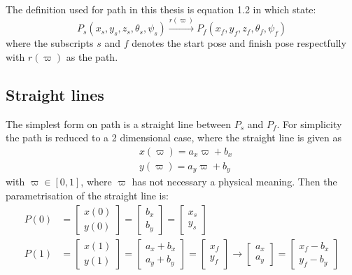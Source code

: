 The definition used for path in this thesis is equation 1.2 in \citep{tsourdos2010cooperative} which state:
\begin{equation}
P_s(x_s,y_s,z_s,\theta_s,\psi_s) \xrightarrow{r(\varpi)} P_f(x_f,y_f,z_f,\theta_f,\psi_f)
\end{equation}
where the subscripts $s$ and $f$ denotes the start pose and finish pose respectfully with $r(\varpi)$ as the path.

\subsection{Straight lines}
The simplest form on path is a straight line between $P_s$ and $P_f$. For simplicity the path is reduced to a 2 dimensional case, where the straight line is given as 
\begin{subequations}
\begin{align}
& x(\varpi) = a_x\varpi + b_x \\
& y(\varpi) = a_y\varpi + b_y 
\end{align}
\end{subequations}
with $ \varpi \in [0,1] $, where $\varpi$ has not necessary a physical meaning. Then the parametrisation of the straight line is:
\begin{subequations}
\begin{align}
P(0) &= \begin{bmatrix}
x(0) \\
y(0)
\end{bmatrix} = \begin{bmatrix}
b_x \\
b_y
\end{bmatrix} = \begin{bmatrix}
x_s \\
y_s
\end{bmatrix} \\
P(1) &= \begin{bmatrix}
x(1) \\
y(1)
\end{bmatrix} = \begin{bmatrix}
a_x + b_x \\
a_y + b_y
\end{bmatrix} = \begin{bmatrix}
x_f \\
y_f
\end{bmatrix} \rightarrow \begin{bmatrix}
a_x \\
a_y
\end{bmatrix} = \begin{bmatrix}
x_f - b_x \\
y_f - b_y
\end{bmatrix}
\end{align}
\end{subequations}
